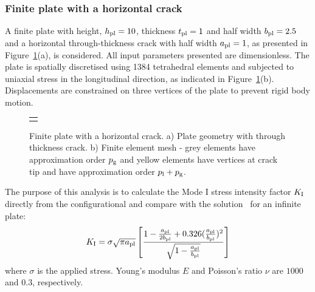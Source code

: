 \documentclass[twocolumn]{svjour3}
\begin{document}
\subsubsection{Finite plate with a horizontal crack}\label{sec:plate_section}
A finite plate with height, $h_{\rm {pl}} = 10$, thickness $t_{\rm {pl}}=1$ and half width $b_{\rm{pl}} = 2.5$ and a horizontal through-thickness crack with half width $a_{\rm {pl}} = 1$, as presented in Figure~\ref{fig:plate_load_mesh}(a), is considered. All input parameters presented are dimensionless. 
The  plate is spatially discretised using 1384 tetrahedral elements and subjected to uniaxial stress in the longitudinal direction, as indicated in Figure~\ref{fig:plate_load_mesh}(b). 
Displacements are constrained on three vertices of the plate to prevent rigid body motion. 

\begin{figure}[h!]
\begin{center}
\begin{tabular}{c}
{\def\svgwidth{8cm} }\\
\end{tabular}
\caption{Finite plate with a horizontal crack. a) Plate geometry with through thickness crack. b) Finite element mesh - grey elements have approximation order $p_{\rm g}$ and yellow elements have vertices at crack tip and have approximation order $p_{\rm l}+p_{\rm g}$. }
\label{fig:plate_load_mesh}
\end{center}
\end{figure}

The purpose of this analysis is to calculate the Mode I stress intensity factor $ K_{\rm I} $ directly from the configurational and compare with the solution~\cite{rooke1976compendium} for an infinite plate:
\begin{equation}\label{eq:frac_analytical}
K_{\rm I}=\sigma \sqrt{\pi a_{\rm {pl}}} \left[  \frac{1 - \frac{a_{\rm {pl}}}{2b_{\rm {pl}}} + 0.326 (\frac{a_{\rm {pl}}}{b_{\rm {pl}}})^2 }{\sqrt{1-\frac{a_{\rm {pl}}}{b_{\rm {pl}}}}}  \right]
\end{equation}
where $\sigma $ is the applied stress. 
Young's modulus $E$ and Poisson's ratio $\nu$ are $1000$ and $0.3$, respectively. 
\end{document}
